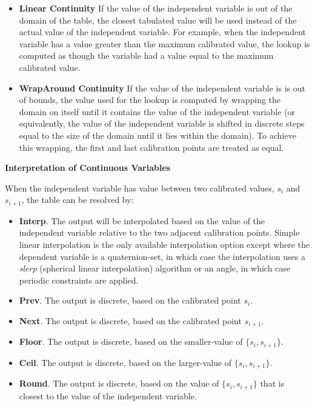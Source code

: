 \documentclass[11pt,fleqn]{report}
\begin{document}
\begin{enumerate}
    \begin{itemize}
    \item \textbf{Linear Continuity} If the value of the independent variable
    is out of the domain of the table, the closest tabulated value will be used
    instead of the actual value of the independent variable.
    For example, when the independent variable has a value greater than the
    maximum calibrated value, the lookup is computed as
    though the variable had a value equal to the maximum calibrated value.
    \item \textbf{WrapAround Continuity} If the value of the independent
    variable is is out of bounds, the value used for the lookup is computed by
    wrapping the domain on itself until it contains the value of the
    independent variable (or equivalently, the value of the independent
    variable is shifted in discrete steps equal to the size of the domain until
     it lies within the domain).  To achieve this wrapping, the first and last
    calibration points are treated as equal.
    \end{itemize}

    \textbf{Interpretation of Continuous Variables}

    When the independent variable has value between two calibrated values,
    $s_i$ and $s_{i+1}$, the table can be resolved by:
    \begin{itemize}
     \item \textbf{Interp}.  The output will be interpolated based on the value
      of the independent variable relative to the two adjacent calibration
      points.
      Simple linear interpolation is the only available interpolation option
      except where the dependent variable is a quaternion-set, in which case
      the interpolation uses a \textit{slerp} (spherical linear interpolation)
      algorithm or an angle, in which case periodic constraints are applied.
     \item \textbf{Prev}. The output is discrete, based on the calibrated point
      $s_{i}$.
     \item \textbf{Next}. The output is discrete, based on the calibrated point
      $s_{i+1}$.
     \item \textbf{Floor}. The output is discrete, based on the smaller-value
      of $\{s_{i}, s_{i+1}\}$.
     \item \textbf{Ceil}. The output is discrete, based on the larger-value of
      $\{s_{i}, s_{i+1}\}$.
     \item \textbf{Round}. The output is discrete, based on the value of
      $\{s_{i}, s_{i+1}\}$ that is closest to the value of the independent
      variable.
    \end{itemize}


\end{enumerate}
\end{document}
